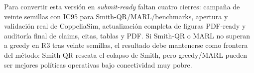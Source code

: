 Para convertir esta versión en \emph{submit-ready} faltan cuatro cierres: campaña de
veinte semillas con IC95 para Smith-QR/MARL/benchmarks, apertura y validación real de
CoppeliaSim, actualización completa de figuras PDF-ready y auditoría final de claims,
citas, tablas y PDF. Si Smith-QR o MARL no superan a greedy en R3 tras veinte semillas,
el resultado debe mantenerse como frontera del método: Smith-QR rescata el colapso de
Smith, pero greedy/MARL pueden ser mejores políticas operativas bajo conectividad muy
pobre.

